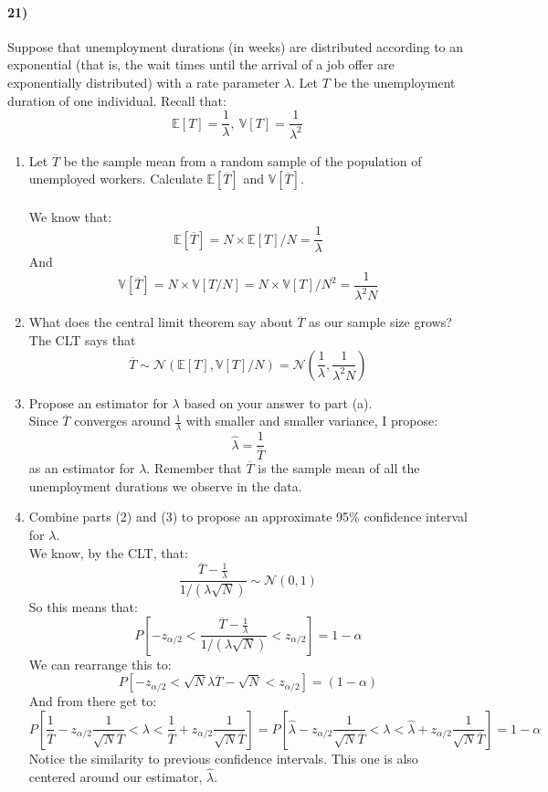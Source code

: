 \documentclass[12pt]{article}
\newcommand\ov{\overline}
\newcommand\BB{\mathbb}
\newcommand\EE{\mathbb{E}}
\newcommand\mc{\mathcal}
\newcommand\h{\hat}
\numberwithin{equation}{section}
\numberwithin{figure}{section}
\numberwithin{table}{section}
\begin{document}
\paragraph{21)} Suppose that unemployment durations (in weeks) are distributed according to an exponential (that is, the wait times until the arrival of a job offer are exponentially distributed) with a rate parameter $\lambda$. Let $T$ be the unemployment duration of one individual. Recall that:
\[\EE[T] = \frac{1}{\lambda},\ \BB{V}[T]=\frac{1}{\lambda^2}\]
\begin{enumerate}
\item Let $\ov{T}$ be the sample mean from a random sample of the population of unemployed workers. Calculate $\EE[\ov{T}]$ and $\BB{V}[\ov{T}]$. \\
\\
{\color{blue}
We know that:
\[\EE[\ov{T}] = N\times \EE[T]/N = \frac{1}{\lambda}\]
And
\[\BB{V}[\ov{T}] = N\times\BB{V}[T/N] = N\times\BB{V}[T]/N^2 = \frac{1}{\lambda^2 N}\]
}
\item What does the central limit theorem say about $\ov{T}$ as our sample size grows? \\
{\color{blue}
The CLT says that
\[\ov{T}\sim \mc{N}(\EE[T],\BB{V}[T]/N) = \mc{N}\left(\frac{1}{\lambda},\frac{1}{\lambda^2 N}\right)\]
}
\item Propose an estimator for $\lambda$ based on your answer to part (a). \\
{\color{blue}
Since $\ov{T}$ converges around $\frac{1}{\lambda}$ with smaller and smaller variance, I propose:
\[\h\lambda = \frac{1}{\ov{T}}\]
as an estimator for $\lambda$. Remember that $\ov{T}$ is the sample mean of all the unemployment durations we observe in the data.}

\item Combine parts (2) and (3) to propose an approximate 95\% confidence interval for $\lambda$. \\
{\color{blue}We know, by the CLT, that:
\[\frac{\ov{T}-\frac{1}{\lambda}}{1/(\lambda\sqrt{N})} \sim \mc{N}(0,1)\]
So this means that:
\[P\left[-z_{\alpha/2}<\frac{\ov{T}-\frac{1}{\lambda}}{1/(\lambda\sqrt{N})}<z_{\alpha/2}\right] = 1-\alpha \]
We can rearrange this to:
\[P[-z_{\alpha/2} < \sqrt{N}\lambda\ov{T} - \sqrt{N} < z_{\alpha/2}] = (1-\alpha)\]
And from there get to:
\[P\left[\frac{1}{\ov{T}} - z_{\alpha/2}\frac{1}{\sqrt{N}\ov{T}}<\lambda<\frac{1}{\ov{T}}+z_{\alpha/2}\frac{1}{\sqrt{N}\ov{T}}\right]
= P\left[\h{\lambda} - z_{\alpha/2}\frac{1}{\sqrt{N}\ov{T}}<\lambda<\h\lambda+z_{\alpha/2}\frac{1}{\sqrt{N}\ov{T}}\right] = 1-\alpha
\]
Notice the similarity to previous confidence intervals. This one is also centered around our estimator, $\h\lambda$.
}
\end{enumerate}
\end{document}
